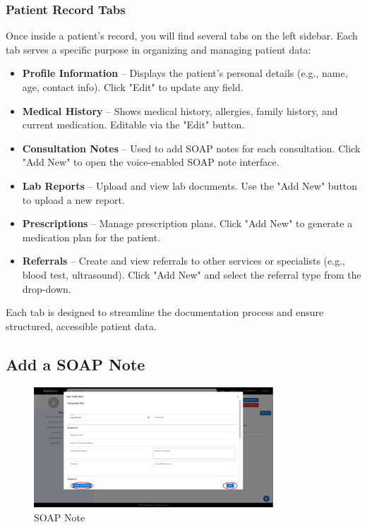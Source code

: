 \documentclass[12pt, titlepage]{article}
\begin{document}
\subsubsection{Patient Record Tabs}
Once inside a patient's record, you will find several tabs on the left sidebar. Each tab serves a specific purpose in organizing and managing patient data:

\begin{itemize}
    \item \textbf{Profile Information} – Displays the patient’s personal details (e.g., name, age, contact info). Click "Edit" to update any field.
    \item \textbf{Medical History} – Shows medical history, allergies, family history, and current medication. Editable via the "Edit" button.
    \item \textbf{Consultation Notes} – Used to add SOAP notes for each consultation. Click "Add New" to open the voice-enabled SOAP note interface.
    \item \textbf{Lab Reports} – Upload and view  lab documents. Use the "Add New" button to upload a new report.
    \item \textbf{Prescriptions} – Manage prescription plans. Click "Add New" to generate a medication plan for the patient.
    \item \textbf{Referrals} – Create and view referrals to other services or specialists (e.g., blood test, ultrasound). Click "Add New" and select the referral type from the drop-down.
\end{itemize}

Each tab is designed to streamline the documentation process and ensure structured, accessible patient data.


\subsection{Add a SOAP Note}

\begin{figure}[H]
\centering
\includegraphics[width=0.8\textwidth]{vtt.png}
\caption{SOAP Note}
\label{fig:SOAP Note}
\end{figure}
\end{document}

